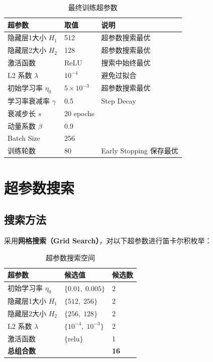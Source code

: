 \documentclass[12pt, a4paper]{article}
\begin{document}
\begin{table}[H]
  \centering
  \caption{最终训练超参数}
  \label{tab:hyperparams}
  \begin{tabular}{lll}
    \toprule
    \textbf{超参数} & \textbf{取值} & \textbf{说明} \\
    \midrule
    隐藏层1大小 $H_1$  & 512    & 超参数搜索最优 \\
    隐藏层2大小 $H_2$  & 128    & 超参数搜索最优 \\
    激活函数          & ReLU   & 搜索中始终最优 \\
    L2 系数 $\lambda$ & $10^{-4}$ & 避免过拟合 \\
    初始学习率 $\eta_0$ & $5\times10^{-3}$ & 超参数搜索最优 \\
    学习率衰减率 $\gamma$ & 0.5  & Step Decay \\
    衰减步长 $s$       & 20 epochs  & \\
    动量系数 $\beta$   & 0.9    & \\
    Batch Size        & 256    & \\
    训练轮数           & 80     & Early Stopping 保存最优 \\
    \bottomrule
  \end{tabular}
\end{table}

\section{超参数搜索}

\subsection{搜索方法}

采用\textbf{网格搜索（Grid Search）}，对以下超参数进行笛卡尔积枚举：

\begin{table}[H]
  \centering
  \caption{超参数搜索空间}
  \label{tab:grid}
  \begin{tabular}{lll}
    \toprule
    \textbf{超参数} & \textbf{候选值} & \textbf{候选数} \\
    \midrule
    初始学习率 $\eta_0$    & $\{0.01,\; 0.005\}$      & 2 \\
    隐藏层1大小 $H_1$      & $\{512,\; 256\}$         & 2 \\
    隐藏层2大小 $H_2$      & $\{256,\; 128\}$         & 2 \\
    L2 系数 $\lambda$      & $\{10^{-4},\; 10^{-3}\}$ & 2 \\
    激活函数               & $\{\mathrm{relu}\}$       & 1 \\
    \midrule
    \multicolumn{2}{l}{\textbf{总组合数}} & \textbf{16} \\
    \bottomrule
  \end{tabular}
\end{table}
\end{document}
